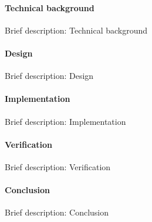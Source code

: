 		\paragraph{Technical background}

Brief description: Technical background

		\paragraph{Design}

Brief description: Design

		\paragraph{Implementation}

Brief description: Implementation

		\paragraph{Verification}

Brief description: Verification

		\paragraph{Conclusion}

Brief description: Conclusion

